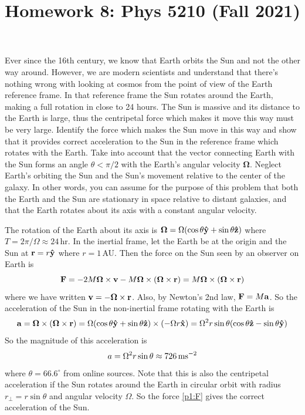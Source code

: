 \documentclass[12pt]{article}
\title{Homework 8: Phys 5210 (Fall 2021)}
\begin{document}
\maketitle
\begin{problem}{1}
Ever since the 16th century, we know that Earth orbits the Sun and not the other
way around. However, we are modern scientists and understand that there's
nothing wrong with looking at cosmos from the point of view of the Earth
reference frame. In that reference frame the Sun rotates around the Earth,
making a full rotation in close to 24 hours. The Sun is massive and its distance
to the Earth is large, thus the centripetal force which makes it move this way
must be very large. Identify the force which makes the Sun move in this way and
show that it provides correct acceleration to the Sun in the reference frame
which rotates with the Earth. Take into account that the vector connecting Earth
with the Sun forms an angle $\theta<\pi /2$ with the Earth's angular velocity
$\bm\Omega$. Neglect Earth's orbiting the Sun and the Sun's movement relative to
the center of the galaxy. In other words, you can assume for the purpose of this
problem that both the Earth and the Sun are stationary in space relative to
distant galaxies, and that the Earth rotates about its axis with a constant
angular velocity.
\begin{solution}
The rotation of the Earth about its axis is
$\bm\Omega=\Omega\qty(\cos\theta\vb{\hat{y}}+\sin\theta\vb{\hat{z}})$ where $T=2\pi
/\Omega\approx 24$\,\si{hr}. In the inertial frame, let the Earth be at the
origin and the Sun at $\vb{r}=r\vb{\hat{y}}$ where $r=1$\,\si{AU}. Then the force on
the Sun seen by an observer on Earth is
\begin{equation}\label{p1:F}
    \vb{F}=-2M\bm\Omega\times\vb{v}-M\bm\Omega\times(\bm\Omega\times\vb{r}) 
    =M\bm\Omega\times\qty(\bm\Omega\times\vb{r})
\end{equation}
where we have written $\vb{v}=-\bm\Omega\times\vb{r}$. Also, by Newton's 2nd
law, $\vb{F}=M\vb{a}$. So the acceleration of the Sun in the non-inertial frame
rotating with the Earth is 
\begin{equation}
    \vb{a}=\bm\Omega\times\qty(\bm\Omega\times\vb{r}) 
    =\Omega\qty(\cos\theta\vb{\hat{y}}+\sin\theta\vb{\hat{z}})\times\qty(-\Omega r\vb{\hat{x}})
    =\Omega^2r\sin\theta\qty(\cos\theta\vb{\hat{z}}-\sin\theta\vb{\hat{y}})
\end{equation}
So the magnitude of this acceleration is
\begin{equation}
    a=\Omega^2r\sin\theta\approx726\,\si{ms\tothe{-2}}
\end{equation}
where $\theta=66.6^\circ$ from online sources. Note that this is also the 
centripetal acceleration if the Sun rotates around the Earth in circular orbit 
with radius $r_\bot=r\sin\theta$ and angular velocity $\Omega$. So the force
\eqref{p1:F} gives the correct acceleration of the Sun.
\end{solution}
\end{problem}
\end{document}
